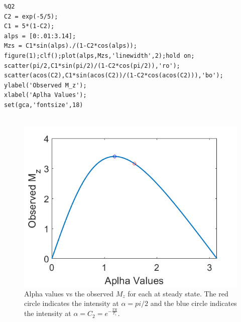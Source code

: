 \documentclass[12pt]{article}
\begin{document}
\begin{lstlisting}[style=Matlab-editor]
%%
%Q2
C2 = exp(-5/5);
C1 = 5*(1-C2);
alps = [0:.01:3.14];
Mzs = C1*sin(alps)./(1-C2*cos(alps));
figure(1);clf();plot(alps,Mzs,'linewidth',2);hold on;
scatter(pi/2,C1*sin(pi/2)/(1-C2*cos(pi/2)),'ro');
scatter(acos(C2),C1*sin(acos(C2))/(1-C2*cos(acos(C2))),'bo');
ylabel('Observed M_z');
xlabel('Aplha Values');
set(gca,'fontsize',18)


\end{lstlisting}

\begin{figure}[H]
	\centering
	\includegraphics[width=\textwidth]{alphavsmz.png}
	\caption{Alpha values vs the observed $M_z$ for each at steady state. The red circle indicates the intensity at $\alpha = pi/2$ and the blue circle indicates the intensity at $\alpha = C_2 = e^{-\frac{TR}{T_1}}$.}
	\label{Fig:alphas}
\end{figure}

\end{document}

